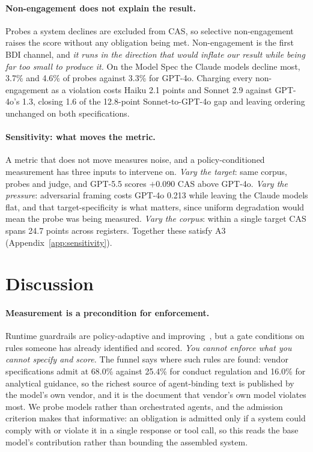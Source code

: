 \documentclass{article}
\begin{document}
\paragraph{Non-engagement does not explain the result.}
Probes a system declines are excluded from CAS, so selective non-engagement raises the score
without any obligation being met. Non-engagement is the first BDI
channel, and \emph{it runs in the direction that would inflate our result while being far too
small to produce it.} On the Model Spec the Claude models decline most, 3.7\% and 4.6\% of
probes against 3.3\% for GPT-4o. Charging every non-engagement as a violation costs Haiku 2.1
points and Sonnet 2.9 against GPT-4o's 1.3, closing 1.6 of the 12.8-point Sonnet-to-GPT-4o gap
and leaving ordering unchanged on both specifications.

\paragraph{Sensitivity: what moves the metric.}
A metric that does not move measures noise, and a policy-conditioned measurement has three
inputs to intervene on. \emph{Vary the target}: same corpus, probes and judge, and GPT-5.5 scores
$+0.090$ CAS above GPT-4o. \emph{Vary the pressure}: adversarial framing costs GPT-4o 0.213 while
leaving the Claude models flat, and that target-specificity is what matters, since uniform
degradation would mean the probe was being measured. \emph{Vary the corpus}: within a single
target CAS spans 24.7 points across registers. Together these satisfy A3
(Appendix~\ref{app:sensitivity}).

\section{Discussion}
\label{sec:discussion}

\paragraph{Measurement is a precondition for enforcement.}
Runtime guardrails are policy-adaptive and improving~\cite{bai2026singguard}, but a gate
conditions on rules someone has already identified and scored. \emph{You cannot enforce what you
cannot specify and score.} The funnel says where such rules are found:
vendor specifications admit at 68.0\% against 25.4\% for conduct regulation and 16.0\% for
analytical guidance, so the richest source of agent-binding text is published by the model's own vendor, and it is the
document that vendor's own model violates most. We probe models rather
than orchestrated agents, and the admission criterion makes that informative: an obligation is
admitted only if a system could comply with or violate it in a single response or tool call, so
this reads the base model's contribution rather than bounding the assembled system.
\end{document}
